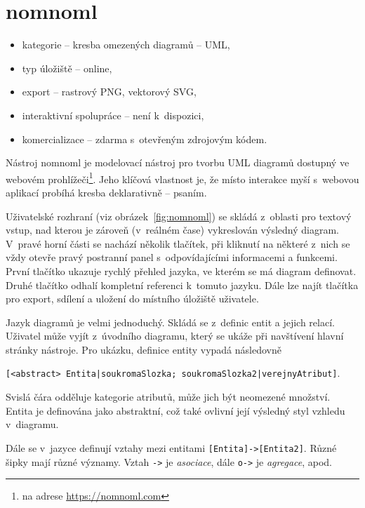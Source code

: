 \section{nomnoml}

\begin{itemize}
  \item kategorie -- kresba omezených diagramů -- UML,
  \item typ úložiště -- online,
  \item export -- rastrový PNG, vektorový SVG,
  \item interaktivní spolupráce -- není k~dispozici,
  \item komercializace -- zdarma s~otevřeným zdrojovým kódem.
\end{itemize}

Nástroj nomnoml je modelovací nástroj pro tvorbu UML diagramů dostupný ve
webovém prohlížeči\footnote{na adrese \url{https://nomnoml.com}}. Jeho klíčová
vlastnost je, že místo interakce myší s~webovou aplikací probíhá kresba
deklarativně -- psaním.

Uživatelské rozhraní (viz obrázek~\ref{fig:nomnoml}) se skládá z~oblasti pro
textový vstup, nad kterou je zároveň (v~reálném čase) vykreslován výsledný
diagram. V~pravé horní části se nachází několik tlačítek, při kliknutí na
některé z~nich se vždy otevře pravý postranní panel s~odpovídajícími informacemi
a funkcemi. První tlačítko ukazuje rychlý přehled jazyka, ve kterém se má
diagram definovat. Druhé tlačítko odhalí kompletní referenci k~tomuto jazyku.
Dále lze najít tlačítka pro export, sdílení a uložení do místního úložiště
uživatele.

Jazyk diagramů je velmi jednoduchý. Skládá se z~definic entit a jejich relací.
Uživatel může vyjít z~úvodního diagramu, který se ukáže při navštívení hlavní
stránky nástroje. Pro ukázku, definice entity vypadá následovně

\noindent\texttt{[<abstract> Entita|soukromaSlozka; soukromaSlozka2|verejnyAtribut]}.

Svislá čára odděluje kategorie atributů, může jich být neomezené množství.
Entita je definována jako abstraktní, což také ovlivní její výsledný styl
vzhledu v~diagramu.

Dále se v~jazyce definují vztahy mezi entitami
\texttt{[Entita]->[Entita2]}. Různé šipky mají různé významy. Vztah \texttt{->}
je \emph{asociace}, dále \texttt{o->} je \emph{agregace}, apod.

